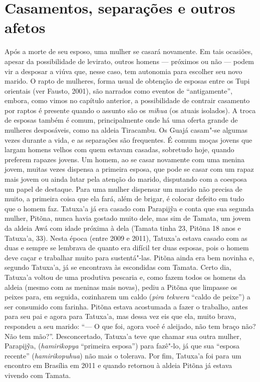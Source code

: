 \section{Casamentos, separações e outros
afetos}\label{casamentos-separauxe7uxf5es-e-outros-afetos}

Após a morte de seu esposo, uma mulher se casará novamente. Em tais
ocasiões, apesar da possibilidade de levirato, outros homens --- próximos
ou não --- podem vir a desposar a viúva que, nesse caso, tem autonomia
para escolher seu novo marido. O rapto de mulheres, forma usual de
obtenção de esposas entre os Tupi orientais (ver Fausto, 2001), são
narrados como eventos de ``antigamente'', embora, como vimos no capítulo
anterior, a possibilidade de contrair casamento por raptos é presente
quando o assunto são os \emph{mihua} (os atuais isolados). A troca de
esposas também é comum, principalmente onde há uma oferta grande de
mulheres desposáveis, como na aldeia Tiracambu. Os Guajá casam"-se
algumas vezes durante a vida, e as separações são frequentes. É comum
moças jovens que largam homens velhos com quem estavam casadas,
sobretudo hoje, quando preferem rapazes jovens. Um homem, ao se casar
novamente com uma menina jovem, muitas vezes dispensa a primeira esposa,
que pode se casar com um rapaz mais jovem ou ainda lutar pela atenção do
marido, disputando com a coesposa um papel de destaque. Para uma mulher
dispensar um marido não precisa de muito, a primeira coisa que ela fará,
além de brigar, é colocar defeito em tudo que o homem faz. Tatuxa'a já
era casado com Parapijỹa e conta que sua segunda mulher, Pitõna, nunca
havia gostado muito dele, mas sim de Tamata, um jovem da aldeia
Awá com idade próxima à dela (Tamata tinha 23, Pitõna 18 anos e
Tatuxa'a, 33). Nesta época (entre 2009 e 2011), Tatuxa'a estava casado
com as duas e sempre se lembrava de quanto era difícil ter duas esposas,
pois o homem deve caçar e trabalhar muito para sustentá"-las. Pitõna
ainda era bem novinha e, segundo Tatuxa'a, já se encontrava às
escondidas com Tamata. Certo dia, Tatuxa'a voltou de uma produtiva
pescaria e, como fazem todos os homens da aldeia (mesmo com as meninas
mais novas), pediu a Pitõna que limpasse os peixes para, em seguida,
cozinharem um caldo (\emph{pira tekwera} ``caldo de peixe'') a ser
consumido com farinha. Pitõna estava acostumada a fazer o trabalho,
antes para seu pai e agora para Tatuxa'a, mas dessa vez eis que ela,
muito brava, respondeu a seu marido: ``--- O que foi, agora você é
aleijado, não tem braço não? Não tem mão?''. Desconcertado, Tatuxa'a teve
que chamar sua outra mulher, Parapijỹa, (\emph{hamirikopya} ``primeira
esposa'') para fazê"-lo, já que sua ``esposa recente''
(\emph{hamirikopuhua}) não mais o tolerava. Por fim, Tatuxa'a foi para
um encontro em Brasília em 2011 e quando retornou à aldeia Pitõna já
estava vivendo com Tamata.

